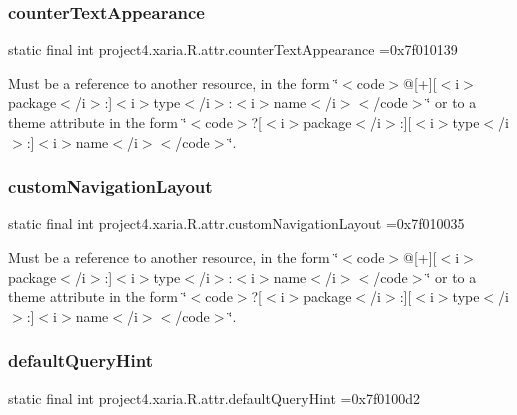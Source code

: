 \subsubsection{\texorpdfstring{counter\+Text\+Appearance}{counterTextAppearance}}
{\footnotesize\ttfamily static final int project4.\+xaria.\+R.\+attr.\+counter\+Text\+Appearance =0x7f010139\hspace{0.3cm}{\ttfamily [static]}}

Must be a reference to another resource, in the form \char`\"{}$<$code$>$@\mbox{[}+\mbox{]}\mbox{[}$<$i$>$package$<$/i$>$\+:\mbox{]}$<$i$>$type$<$/i$>$\+:$<$i$>$name$<$/i$>$$<$/code$>$\char`\"{} or to a theme attribute in the form \char`\"{}$<$code$>$?\mbox{[}$<$i$>$package$<$/i$>$\+:\mbox{]}\mbox{[}$<$i$>$type$<$/i$>$\+:\mbox{]}$<$i$>$name$<$/i$>$$<$/code$>$\char`\"{}. \mbox{\label{classproject4_1_1xaria_1_1R_1_1attr_a89d381c5253acbcfebf892bf1e24d0c2}} 
\subsubsection{\texorpdfstring{custom\+Navigation\+Layout}{customNavigationLayout}}
{\footnotesize\ttfamily static final int project4.\+xaria.\+R.\+attr.\+custom\+Navigation\+Layout =0x7f010035\hspace{0.3cm}{\ttfamily [static]}}

Must be a reference to another resource, in the form \char`\"{}$<$code$>$@\mbox{[}+\mbox{]}\mbox{[}$<$i$>$package$<$/i$>$\+:\mbox{]}$<$i$>$type$<$/i$>$\+:$<$i$>$name$<$/i$>$$<$/code$>$\char`\"{} or to a theme attribute in the form \char`\"{}$<$code$>$?\mbox{[}$<$i$>$package$<$/i$>$\+:\mbox{]}\mbox{[}$<$i$>$type$<$/i$>$\+:\mbox{]}$<$i$>$name$<$/i$>$$<$/code$>$\char`\"{}. \mbox{\label{classproject4_1_1xaria_1_1R_1_1attr_a7c6f196b7ed575f9a37173eacdc60512}} 
\subsubsection{\texorpdfstring{default\+Query\+Hint}{defaultQueryHint}}
{\footnotesize\ttfamily static final int project4.\+xaria.\+R.\+attr.\+default\+Query\+Hint =0x7f0100d2\hspace{0.3cm}{\ttfamily [static]}}

